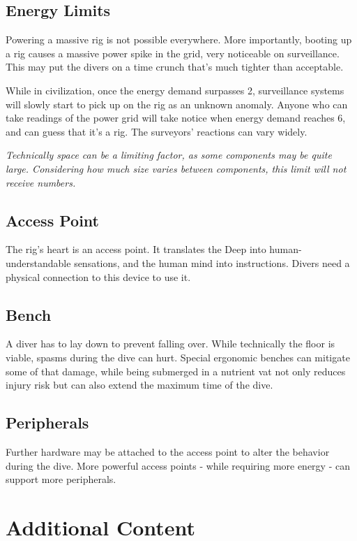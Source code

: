 \documentclass[12pt,a4paper,openany,usenames,dvipsnames]{book}
\begin{document}
	\section{Energy Limits}
	Powering a massive rig is not possible everywhere.
	More importantly, booting up a rig causes a massive power spike in the grid, very noticeable on surveillance.
	This may put the divers on a time crunch that's much tighter than acceptable.
	\par
	While in civilization, once the energy demand surpasses 2, surveillance systems will slowly start to pick up on the rig as an unknown anomaly.
	Anyone who can take readings of the power grid will take notice when energy demand reaches 6, and can guess that it's a rig.
	The surveyors' reactions can vary widely.
	\begin{exampleblock}
		\itshape
		Technically space can be a limiting factor, as some components may be quite large.
		Considering how much size varies between components, this limit will not receive numbers.
	\end{exampleblock}
	\section{Access Point}
	The rig's heart is an access point.
	It translates the Deep into human-understandable sensations, and the human mind into instructions.
	Divers need a physical connection to this device to use it.
	\section{Bench}
	A diver has to lay down to prevent falling over.
	While technically the floor is viable, spasms during the dive can hurt.
	Special ergonomic benches can mitigate some of that damage,
		while being submerged in a nutrient vat not only reduces injury risk but can also extend the maximum time of the dive.
	\section{Peripherals}
	Further hardware may be attached to the access point to alter the behavior during the dive.
	More powerful access points - while requiring more energy - can support more peripherals.

	\chapter{Additional Content}
	
	

\end{document}
